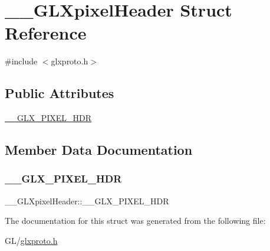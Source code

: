 \hypertarget{struct_____g_l_xpixel_header}{}\section{\+\_\+\+\_\+\+G\+L\+Xpixel\+Header Struct Reference}
\label{struct_____g_l_xpixel_header}


{\ttfamily \#include $<$glxproto.\+h$>$}

\subsection*{Public Attributes}
\begin{DoxyCompactItemize}
\item 
\hyperlink{struct_____g_l_xpixel_header_a799d445cbaef71ed06314aa9b281e993}{\+\_\+\+\_\+\+G\+L\+X\+\_\+\+P\+I\+X\+E\+L\+\_\+\+H\+DR}
\end{DoxyCompactItemize}


\subsection{Member Data Documentation}
\mbox{\label{struct_____g_l_xpixel_header_a799d445cbaef71ed06314aa9b281e993}} 
\subsubsection{\texorpdfstring{\+\_\+\+\_\+\+G\+L\+X\+\_\+\+P\+I\+X\+E\+L\+\_\+\+H\+DR}{\_\_GLX\_PIXEL\_HDR}}
{\footnotesize\ttfamily \+\_\+\+\_\+\+G\+L\+Xpixel\+Header\+::\+\_\+\+\_\+\+G\+L\+X\+\_\+\+P\+I\+X\+E\+L\+\_\+\+H\+DR}



The documentation for this struct was generated from the following file\+:\begin{DoxyCompactItemize}
\item 
G\+L/\hyperlink{glxproto_8h}{glxproto.\+h}\end{DoxyCompactItemize}
